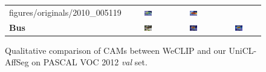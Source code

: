 \begin{figure}[ht]
\begin{tcolorbox}[colframe=black!60, colback=white, boxrule=0.8pt, arc=2pt, left=2pt, right=2pt, top=2pt, bottom=2pt]
\begin{tabular}{m{3cm} c c c}
      {figures/originals/2010_005119}
       & \includegraphics[width=0.20\textwidth,height=0.20\textwidth]
      {figures/val_cams/weclip/2010_005119_6}
       & \includegraphics[width=0.20\textwidth,height=0.20\textwidth]
      {figures/val_cams/ours/2010_005119_6}
      \\
      \textbf{Bus}
       & \includegraphics[width=0.20\textwidth,height=0.20\textwidth]
      {figures/originals/2010_000148}
       & \includegraphics[width=0.20\textwidth,height=0.20\textwidth]
      {figures/val_cams/weclip/2010_000148_5}
       & \includegraphics[width=0.20\textwidth,height=0.20\textwidth]
      {figures/val_cams/ours/2010_000148_5}
      \\
    \end{tabular}
  \end{tcolorbox}

  \caption{Qualitative comparison of CAMs between WeCLIP and our UniCL-AffSeg on PASCAL VOC 2012 \textit{val} set.}
  \label{fig:qualitative_comparison_cam_val}
\end{figure}


